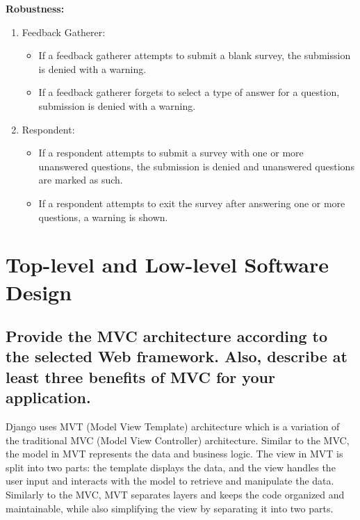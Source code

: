 \documentclass[letterpaper, 12 pt, conference]{ieeeconf}
\begin{document}
\hfill \break
\newpage

\textbf{Robustness:}
\begin{enumerate}
    \item[] Feedback Gatherer:
    \begin{itemize}
        \item  If a feedback gatherer attempts to submit a blank survey, the submission is denied with a warning.
        \item If a feedback gatherer forgets to select a type of answer for a question, submission is denied with a warning.
    \end{itemize}
    \item[] Respondent:
    \begin{itemize}
        \item If a respondent attempts to submit a survey with one or more unanswered questions, the submission is denied and unanswered questions are marked as such.
        \item If a respondent attempts to exit the survey after answering one or more questions, a warning is shown.
    \end{itemize}
\end{enumerate}

\newpage 
\section{Top-level and Low-level Software Design}
\subsection{Provide the MVC architecture according to the selected Web framework. Also, describe at least three benefits of MVC for your application.}
\newline
\hfill

Django uses MVT (Model View Template) architecture which is a variation of the traditional MVC (Model View Controller) architecture. Similar to the MVC, the model in MVT represents the data and business logic. The view in MVT is split into two parts: the template displays the data, and the view handles the user input and interacts with the model to retrieve and manipulate the data. Similarly to the MVC, MVT separates layers and keeps the code organized and maintainable, while also simplifying the view by separating it into two parts. 
\newline
\end{document}
